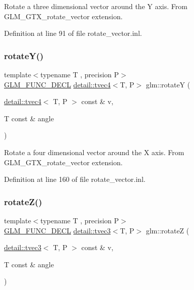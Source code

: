 Rotate a three dimensional vector around the Y axis. From G\+L\+M\+\_\+\+G\+T\+X\+\_\+rotate\+\_\+vector extension. 

Definition at line 91 of file rotate\+\_\+vector.\+inl.

\mbox{\label{group__gtx__rotate__vector_gae48a26ac0e3670ad2486858bf2a8e90b}} 
\subsubsection{\texorpdfstring{rotate\+Y()}{rotateY()}\hspace{0.1cm}{\footnotesize\ttfamily [2/2]}}
{\footnotesize\ttfamily template$<$typename T , precision P$>$ \\
\hyperlink{setup_8hpp_ab2d052de21a70539923e9bcbf6e83a51}{G\+L\+M\+\_\+\+F\+U\+N\+C\+\_\+\+D\+E\+CL} \hyperlink{structglm_1_1detail_1_1tvec4}{detail\+::tvec4}$<$T, P$>$ glm\+::rotateY (\begin{DoxyParamCaption}\item[{\hyperlink{structglm_1_1detail_1_1tvec4}{detail\+::tvec4}$<$ T, P $>$ const \&}]{v,  }\item[{T const \&}]{angle }\end{DoxyParamCaption})}

Rotate a four dimensional vector around the X axis. From G\+L\+M\+\_\+\+G\+T\+X\+\_\+rotate\+\_\+vector extension. 

Definition at line 160 of file rotate\+\_\+vector.\+inl.

\mbox{\label{group__gtx__rotate__vector_gae5c27548f86f1e95f76a87cf16f512da}} 
\subsubsection{\texorpdfstring{rotate\+Z()}{rotateZ()}\hspace{0.1cm}{\footnotesize\ttfamily [1/2]}}
{\footnotesize\ttfamily template$<$typename T , precision P$>$ \\
\hyperlink{setup_8hpp_ab2d052de21a70539923e9bcbf6e83a51}{G\+L\+M\+\_\+\+F\+U\+N\+C\+\_\+\+D\+E\+CL} \hyperlink{structglm_1_1detail_1_1tvec3}{detail\+::tvec3}$<$T, P$>$ glm\+::rotateZ (\begin{DoxyParamCaption}\item[{\hyperlink{structglm_1_1detail_1_1tvec3}{detail\+::tvec3}$<$ T, P $>$ const \&}]{v,  }\item[{T const \&}]{angle }\end{DoxyParamCaption})}

